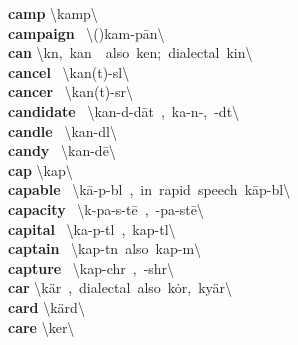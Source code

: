\documentclass[10pt,a4paper]{article}
\begin{document}
\begin{multicols}{2}
\textbf{ camp }\quad \textbackslash \textprimstress kamp\textbackslash \\
\textbf{ campaign }\quad \ \textbackslash (\textsecstress )kam-\textprimstress p\={a}n\textbackslash \\
\textbf{ can }\quad \textbackslash k\textschwa n,\ \textprimstress kan\ \ also\ \textprimstress ken;\ dialectal\ \textprimstress kin\textbackslash \\
\textbf{ cancel }\quad \ \textbackslash \textprimstress kan(t)-s\textschwa l\textbackslash \\
\textbf{ cancer }\quad \ \textbackslash \textprimstress kan(t)-s\textschwa r\textbackslash \\
\textbf{ candidate }\quad \ \textbackslash \textprimstress kan-d\textschwa -\textsecstress d\={a}t\ ,\ \textprimstress ka-n\textschwa -,\ -d\textschwa t\textbackslash \\
\textbf{ candle }\quad \ \textbackslash \textprimstress kan-d\textsuperscript{\textreve}l\textbackslash \\
\textbf{ candy }\quad \ \textbackslash \textprimstress kan-d\={e}\textbackslash \\
\textbf{ cap }\quad \textbackslash \textprimstress kap\textbackslash \\
\textbf{ capable }\quad \ \textbackslash \textprimstress k\={a}-p\textschwa -b\textschwa l\ ,\ in\ rapid\ speech\ \textprimstress k\={a}p-b\textschwa l\textbackslash \\
\textbf{ capacity }\quad \ \textbackslash k\textschwa -\textprimstress pa-s\textschwa -t\={e}\ ,\ -\textprimstress pa-st\={e}\textbackslash \\
\textbf{ capital }\quad \ \textbackslash \textprimstress ka-p\textschwa -t\textsuperscript{\textreve}l\ ,\ \textprimstress kap-t\textsuperscript{\textreve}l\textbackslash \\
\textbf{ captain }\quad \ \textbackslash \textprimstress kap-t\textschwa n\ also\ \textprimstress kap-\textsuperscript{\textreve}m\textbackslash \\
\textbf{ capture }\quad \ \textbackslash \textprimstress kap-ch\textschwa r\ ,\ -sh\textschwa r\textbackslash \\
\textbf{ car }\quad \textbackslash \textprimstress k\"{a}r\ ,\ dialectal\ also\ \textprimstress k\.{o}r,\ \textprimstress ky\"{a}r\textbackslash \\
\textbf{ card }\quad \textbackslash \textprimstress k\"{a}rd\textbackslash \\
\textbf{ care }\quad \textbackslash \textprimstress ker\textbackslash \\

\end{multicols}
\end{document}
